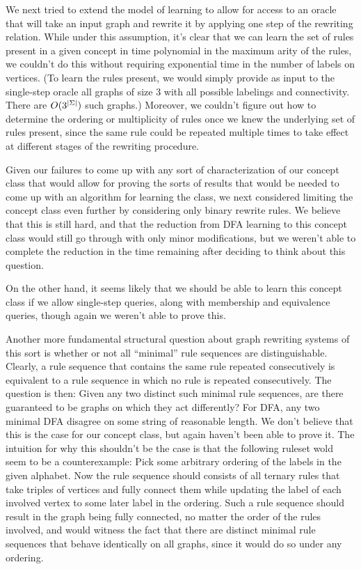 \documentclass[]{article}
\begin{document}
We next tried to extend the model of learning to allow for access to an oracle
that will take an input graph and rewrite it by applying one step of the
rewriting relation. While under this assumption, it's clear that we can learn
the set of rules present in a given concept in time polynomial in the maximum
arity of the rules, we couldn't do this without requiring exponential time in the number
of labels on vertices. (To learn the rules present, we would simply
provide as input to the single-step oracle all graphs of size 3 with
all possible labelings and connectivity. There are
$O(3^{\left| \Sigma \right|})$ such graphs.) Moreover, we couldn't figure out
how to determine the ordering or multiplicity of rules once we knew
the underlying set of rules present, since the same rule could be
repeated multiple times to take effect at 
different stages of the rewriting procedure.

Given our failures to come up with any sort of characterization of our concept
class that would allow for proving the sorts of results that would be needed to
come up with an algorithm for learning the class, we next considered limiting
the concept class even further by considering only binary rewrite rules. We
believe that this is still hard, and that the reduction from DFA learning to
this concept class would still go through with only minor modifications, but we
weren't able to complete the reduction in the time remaining after deciding to
think about this question.

On the other hand, it seems likely that we should be able to learn this concept
class if we allow single-step queries, along with membership and equivalence
queries, though again we weren't able to prove this.

Another more fundamental structural question about graph rewriting
systems of this sort is whether or not all ``minimal'' rule
sequences are distinguishable. Clearly, a rule sequence that contains the same
rule repeated consecutively is equivalent to a rule sequence in which no rule is
repeated consecutively. The question is then: Given any two distinct such
minimal rule sequences, are there guaranteed to be graphs on which
they act differently? For DFA, any two minimal 
DFA disagree on some string of reasonable length. We don't believe that this is
the case for our concept class, but again haven't been able to prove it. The
intuition for why this shouldn't be the case is that the following ruleset wold
seem to be a counterexample: Pick some arbitrary ordering of the labels in the
given alphabet. Now the rule sequence should consists of all ternary rules that
take triples of vertices and fully connect them while updating the label of each
involved vertex to some later label in the ordering. Such a rule sequence should
result in the graph being fully connected, no matter the order of the rules
involved, and would witness the fact that there are distinct minimal rule
sequences that behave identically on all graphs, since it would do so
under any ordering.
\end{document}
